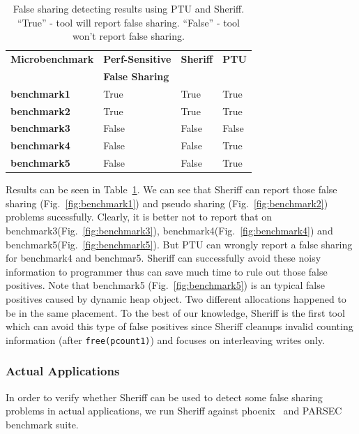 \begin{table}
\centering
\begin{tabular}{|l|l|l|l|}
\hline
{\bf \small Microbenchmark} & {\bf \small Perf-Sensitive} & {\bf \small Sheriff } & {\bf \small PTU } \\
 & {\bf \small False Sharing} & & \\
\hline

\small \textbf{benchmark1} & True & True & True\\
\small \textbf{benchmark2} & True & True & True\\
\small \textbf{benchmark3} & False & False & False\\
\small \textbf{benchmark4} & False & False & True\\
\small \textbf{benchmark5} & False & False & True\\
\hline
\end{tabular}
\caption{False sharing detecting results using PTU and Sheriff. 
``True'' - tool will report false sharing. ``False'' - tool won't report false sharing. 
\label{table:microbenchmarks}}
\end{table}

Results can be seen in Table~\ref{table:microbenchmarks}. We can see that Sheriff can report those 
false sharing (Fig.~\ref{fig:benchmark1}) and pseudo sharing (Fig.~\ref{fig:benchmark2}) problems sucessfully. 
Clearly, it is better not to report that on benchmark3(Fig.~\ref{fig:benchmark3}), 
benchmark4(Fig.~\ref{fig:benchmark4}) and benchmark5(Fig.~\ref{fig:benchmark5}). 
But PTU can wrongly report a false sharing for benchmark4 and benchmar5.
Sheriff can successfully avoid these noisy information to programmer 
thus can save much time to rule out those false positives.
Note that benchmark5 (Fig.~\ref{fig:benchmark5}) is an typical false positives 
caused by dynamic heap object. 
Two different allocations happened to be in the same placement. 
To the best of our knowledge, Sheriff is the first tool 
which can avoid this type of false positives since Sheriff 
cleanups invalid counting information (after \texttt{free(pcount1)})
and focuses on interleaving writes only.
\subsubsection{Actual Applications}
\label{effect-application}
In order to verify whether Sheriff can be used to detect some false sharing problems in actual applications,
we run Sheriff against phoenix~\cite{phoenix-hpca} and PARSEC~\cite{parsec} benchmark suite.

